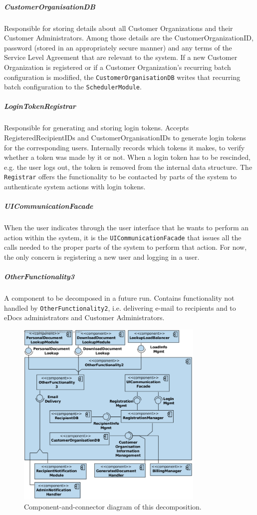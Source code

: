 \documentclass[a4paper,10pt]{article}
\begin{document}
\subparagraph{CustomerOrganisationDB}
Responsible for storing details about all Customer Organizations and their Customer Administrators. Among those details are the CustomerOrganizationID, password (stored in an appropriately secure manner) and any terms of the Service Level Agreement that are relevant to the system. If a new Customer Organization is registered or if a Customer Organization's recurring batch configuration is modified, the \texttt{CustomerOrganisationDB} writes that recurring batch configuration to the \texttt{SchedulerModule}.

\subparagraph{LoginTokenRegistrar}
Responsible for generating and storing login tokens. Accepts RegisteredRecipientIDs and CustomerOrganisationIDs to generate login tokens for the corresponding users. Internally records which tokens it makes, to verify whether a token was made by it or not. When a login token has to be rescinded, e.g. the user logs out, the token is removed from the internal data structure. The \texttt{Registrar} offers the functionality to be contacted by parts of the system to authenticate system actions with login tokens.

\subparagraph{UICommunicationFacade}
When the user indicates through the user interface that he wants to perform an action within the system, it is the \texttt{UICommunicationFacade} that issues all the calls needed to the proper parts of the system to perform that action. For now, the only concern is registering a new user and logging in a user.

\subparagraph{OtherFunctionality3}
A component to be decomposed in a future run. Contains functionality not handled by \texttt{OtherFunctionality2}, i.e. delivering e-mail to recipients and to eDocs administrators and Customer Administrators.

\begin{figure}[!htp]
    \centering
    \includegraphics[width=0.8\textwidth]{comp_diag_3.png}
    \caption{Component-and-connector diagram of this decomposition.
        }\label{fig:it3-cc_main}
\end{figure}
\end{document}
